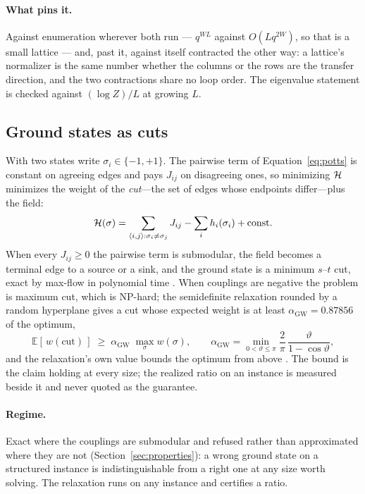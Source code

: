 \documentclass[11pt,a4paper]{article}
\begin{document}
\paragraph{What pins it.}
Against enumeration wherever both run --- $q^{WL}$ against $O(L q^{2W})$, so
that is a small lattice --- and, past it, against itself contracted the other
way: a lattice's normalizer is the same number whether the columns or the rows
are the transfer direction, and the two contractions share no loop order. The
eigenvalue statement is checked against $(\log Z)/L$ at growing $L$.

\subsection{Ground states as cuts}
\label{sec:potts-cuts}
With two states write $\sigma_i \in \{-1, +1\}$. The pairwise term of
Equation~\ref{eq:potts} is constant on agreeing edges and pays $J_{ij}$ on
disagreeing ones, so minimizing $\mathcal{H}$ minimizes the weight of the
\emph{cut}---the set of edges whose endpoints differ---plus the field:
\begin{equation}
  \mathcal{H}(\sigma) = \sum_{\langle i,j \rangle : \sigma_i \ne \sigma_j} J_{ij}
                    - \sum_i h_i(\sigma_i) + \text{const}.
  \label{eq:cut-energy}
\end{equation}
When every $J_{ij} \ge 0$ the pairwise term is submodular, the field becomes
a terminal edge to a source or a sink, and the ground state is a minimum
$s$--$t$ cut, exact by max-flow in polynomial time \citep{greig1989, clrs2022}.
When couplings are negative the problem is maximum cut, which is NP-hard; the
semidefinite relaxation rounded by a random hyperplane gives a cut whose
expected weight is at least $\alpha_{\mathrm{GW}} = 0.87856$ of the optimum,
\begin{equation}
  \mathbb{E}[\,w(\text{cut})\,] \;\ge\; \alpha_{\mathrm{GW}}\; \max_{\sigma} w(\sigma),
  \qquad
  \alpha_{\mathrm{GW}} = \min_{0 < \vartheta \le \pi}
    \frac{2}{\pi}\,\frac{\vartheta}{1 - \cos\vartheta},
  \label{eq:gw}
\end{equation}
and the relaxation's own value bounds the optimum from above
\citep{goemans1995}. The bound is the claim holding at every size; the realized
ratio on an instance is measured beside it and never quoted as the guarantee.

\paragraph{Regime.}
Exact where the couplings are submodular and refused rather than approximated
where they are not (Section~\ref{sec:properties}): a wrong ground state on a
structured instance is indistinguishable from a right one at any size worth
solving. The relaxation runs on any instance and certifies a ratio.
\end{document}
